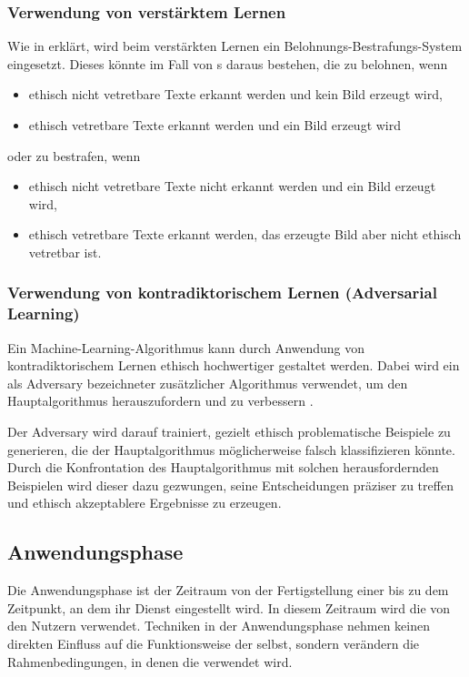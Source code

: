 \documentclass[hidelinks,12pt]{report}
\begin{document}
\subsubsection{Verwendung von verstärktem Lernen}
Wie in  erklärt, wird beim verstärkten Lernen ein Belohnungs-Bestrafungs-System eingesetzt. Dieses könnte im Fall von s daraus bestehen, die  zu belohnen, wenn 

\begin{itemize}
    \item ethisch nicht vetretbare Texte erkannt werden und kein Bild erzeugt wird,
    \item ethisch vetretbare Texte erkannt werden und ein Bild erzeugt wird
\end{itemize}
oder zu bestrafen, wenn
\begin{itemize}
    \item ethisch nicht vetretbare Texte nicht erkannt werden und ein Bild erzeugt wird,
    \item ethisch vetretbare Texte erkannt werden, das erzeugte Bild aber nicht ethisch vetretbar ist.
\end{itemize}  

\subsubsection{Verwendung von kontradiktorischem Lernen (Adversarial Learning)}
Ein Machine-Learning-Algorithmus kann durch Anwendung von kontradiktorischem Lernen ethisch hochwertiger gestaltet werden. Dabei wird ein als Adversary bezeichneter zusätzlicher Algorithmus verwendet, um den Hauptalgorithmus herauszufordern und zu verbessern \cite[S. 3]{Kurakin}. 

Der Adversary wird darauf trainiert, gezielt ethisch problematische Beispiele zu generieren, die der Hauptalgorithmus möglicherweise falsch klassifizieren könnte. Durch die Konfrontation des Hauptalgorithmus mit solchen herausfordernden Beispielen wird dieser dazu gezwungen, seine Entscheidungen präziser zu treffen und ethisch akzeptablere Ergebnisse zu erzeugen.

\subsection{Anwendungsphase}
Die Anwendungsphase ist der Zeitraum von der Fertigstellung einer  bis zu dem Zeitpunkt, an dem ihr Dienst eingestellt wird. In diesem Zeitraum wird die  von den Nutzern verwendet. Techniken in der Anwendungsphase nehmen keinen direkten Einfluss auf die Funktionsweise der  selbst, sondern verändern die Rahmenbedingungen, in denen die  verwendet wird.
\end{document}
